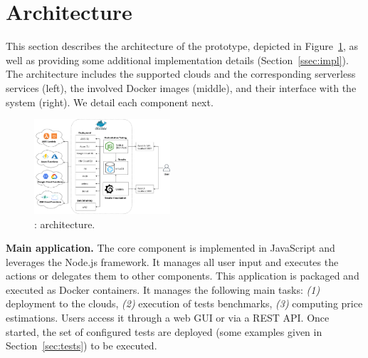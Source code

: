 \section{Architecture}\label{sec:architecture}
This section describes the architecture of the \sys prototype, depicted in Figure~\ref{fig:architecture}, as well as providing some additional implementation details (Section~\ref{ssec:impl}).
The architecture includes the supported clouds and the corresponding serverless services (left), the involved Docker images (middle), and their interface with the system (right).
We detail each component next. 

\begin{figure}[!t]
\begin{center}
\includegraphics[width=0.45\textwidth]{bilder/main_app.png}
\caption{\sys: architecture.}
\label{fig:architecture}
\end{center}
\end{figure}



\textbf{Main application.} The \sys core component is implemented in JavaScript and leverages the Node.js framework. 
It manages all user input and executes the actions or delegates them to other components. 
This application is packaged and executed as Docker containers. 
It manages the following main tasks: \emph{(1)} deployment to the clouds, \emph{(2)} execution of tests benchmarks, \emph{(3)} computing price estimations. 
Users access it through a web \gls{GUI} or via a REST \gls{API}. 
Once started, the set of configured tests are deployed (some examples given in Section~\ref{sec:tests}) to be executed.

